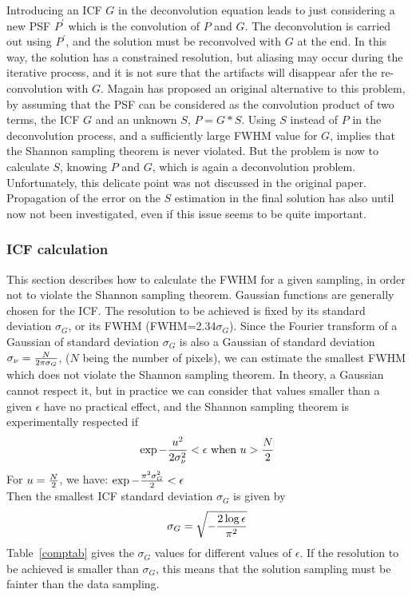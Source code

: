 \documentclass[11pt,a4paper]{article}
\begin{document}
Introducing an ICF $G$ in the deconvolution equation leads to
just considering a 
new PSF $P^\prime$ which is the convolution of $P$ and $G$.
The deconvolution is carried out using $P^\prime$, and the solution 
must be 
reconvolved with $G$ at the end. In this way, the solution has a constrained
resolution, but aliasing may occur during the iterative process, and it 
is
not sure that the artifacts will disappear afer the re-convolution with 
$G$.
Magain \cite*{rest:magain98} has proposed an original alternative to 
this
problem, by assuming that the  PSF can be considered as the convolution
product of two terms, the ICF $G$ and an unknown $S$, $P=G*S$. Using
$S$ instead of $P$ in the deconvolution process, and a sufficiently large 
FWHM value for $G$,  implies that the 
Shannon sampling theorem \cite{ima:shannon48} is never
violated. But the problem is now to calculate $S$, knowing $P$ and $G$,
which is again a deconvolution problem. Unfortunately, 
this delicate point was not discussed in the original paper. Propagation 
of the error on the $S$ estimation in the final solution has also until now 
not been investigated, even if this issue seems to be quite 
important.

\subsubsection*{ICF calculation}

This section describes how to calculate the FWHM
for a given sampling, in order not to violate the Shannon
sampling theorem. Gaussian functions are generally chosen for the ICF. 
The resolution to be
achieved is fixed by its standard deviation $\sigma_G$, or its FWHM
(FWHM=2.34$\sigma_G$). Since the Fourier transform of a Gaussian 
of standard deviation $\sigma_G$ is
also a Gaussian of standard deviation $\sigma_\nu = {N \over 2\pi 
\sigma_G}$,
($N$ being the number of pixels), we can estimate the smallest FWHM 
which 
does not violate the Shannon sampling theorem.  
In theory, a Gaussian cannot respect it,
 but in practice we can consider that values smaller than a given 
$\epsilon$ 
have no practical effect, and the Shannon sampling theorem is 
experimentally
respected if 
\begin{eqnarray}
\exp{ -{u^2 \over 2 \sigma_{\nu}^2}} < \epsilon \mbox{ when } u > {N 
\over 2}
\end{eqnarray}
For $u = {N \over 2}$, we have:
$
\exp{ -{\pi^2\sigma_G^2 \over 2 }} < \epsilon
$ \\
Then the smallest ICF standard deviation $\sigma_{G}$ is given by
\begin{eqnarray}
\sigma_G = \sqrt{-{2 \log{\epsilon} \over \pi^2}}
\end{eqnarray}
Table~\ref{comptab} gives the $\sigma_G$ values for different values
of $\epsilon$. If the resolution to be achieved is smaller than $\sigma_G$,
this means that the solution sampling must be fainter than the data 
sampling.
\end{document}

